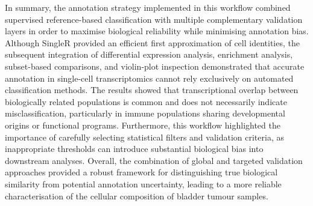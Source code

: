 In summary, the annotation strategy implemented in this workflow combined supervised reference-based classification with multiple complementary validation layers in order to maximise biological reliability while minimising annotation bias. Although SingleR provided an efficient first approximation of cell identities, the subsequent integration of differential expression analysis, enrichment analysis, subset-based comparisons, and violin-plot inspection demonstrated that accurate annotation in single-cell transcriptomics cannot rely exclusively on automated classification methods. The results showed that transcriptional overlap between biologically related populations is common and does not necessarily indicate misclassification, particularly in immune populations sharing developmental origins or functional programs. Furthermore, this workflow highlighted the importance of carefully selecting statistical filters and validation criteria, as inappropriate thresholds can introduce substantial biological bias into downstream analyses. Overall, the combination of global and targeted validation approaches provided a robust framework for distinguishing true biological similarity from potential annotation uncertainty, leading to a more reliable characterisation of the cellular composition of bladder tumour samples.





